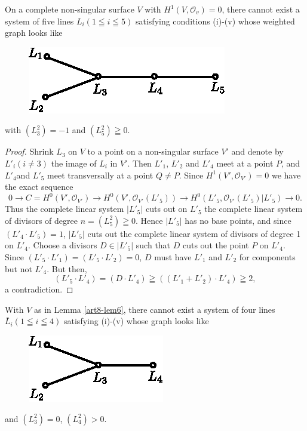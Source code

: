 \begin{lem}\label{art8-lem6}%
On a complete non-singular surface $V$ with $H^1 (V, \mathscr{O}_v) =0$, there cannot exist a system of five lines $L_i (1 \leqq i \leqq 5)$ satisfying conditions (i)-(v) whose weighted graph looks like
\begin{figure}[H]
\centering
\includegraphics{fig9.eps}
\end{figure}
\noindent
with $(L^2_3) = -1 $ and $(L^2_5) \geqq 0$.
\end{lem}

\begin{proof}
Shrink $L_3$ on $V$ to a point on a non-singular surface $V'$ and denote by $L'_i (i \neq 3)$ the image of $L_i$ in $V'$. Then $L'_1$, $L'_2$ and $L'_4$ meet at a point $P$, and $L'_4$\pageoriginale and $L'_5$ meet transversally at a  point $Q \neq P$. Since $H^1(V',\mathscr{O}_{V'}) =0$ we have the exact sequence
$$
0 \to C = H^0 (V', \mathscr{O}_{V'}) \to H^0 (V', \mathscr{O}_{V'} (L'_5)) \to H^0 (L'_5, \mathscr{O}_{V'} (L'_5)|L'_5) \to 0.
$$
Thus the complete linear system $|L'_5|$ cuts out on $L'_5$ the complete linear system of divisors of degree $n = (L^2_5) \geqq 0$. Hence $|L'_5|$ has no base points, and since $(L'_4 \cdot L'_5) =1$, $|L'_5|$ cuts out the complete linear system of divisors of degree 1 on $L'_4$. Choose a divisors $D \in |L'_5|$ such that $D$ cuts out the point $P$ on $L'_4$. Since $(L'_5 \cdot L'_1) = (L'_5 \cdot L'_2)= 0$, $D$ must have $L'_1$ and $L'_2$ for components but not $L'_4$. But then,
$$
(L'_5 \cdot L'_4) = (D \cdot L'_4) \geqq ((L'_1 + L'_2) \cdot L'_4) \geqq 2,
$$
a contradiction.
\end{proof}

\begin{coro*}
With $V$ as in Lemma \ref{art8-lem6}, there cannot exist a system of four lines $\bar{L}_i (1 \leqq i \leqq 4)$ satisfying (i)-(v) whose graph looks like
\begin{figure}[H]
\centering
\includegraphics{fig10.eps}
\end{figure}
\noindent
and $\left(L^2_3 \right) =0$, $\left(L^2_4 \right) > 0$.
\end{coro*}

